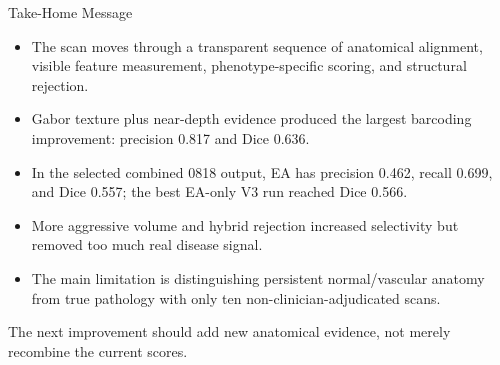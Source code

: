 \documentclass[aspectratio=169]{beamer}
\begin{document}
\begin{frame}{Take-Home Message}

\begin{itemize}
    \item The scan moves through a transparent sequence of anatomical
    alignment, visible feature measurement, phenotype-specific scoring, and
    structural rejection.
    \item Gabor texture plus near-depth evidence produced the largest barcoding
    improvement: precision 0.817 and Dice 0.636.
    \item In the selected combined 0818 output, EA has precision 0.462, recall
    0.699, and Dice 0.557; the best EA-only V3 run reached Dice 0.566.
    \item More aggressive volume and hybrid rejection increased selectivity
    but removed too much real disease signal.
    \item The main limitation is distinguishing persistent normal/vascular
    anatomy from true pathology with only ten non-clinician-adjudicated scans.
\end{itemize}

\vspace{0.3cm}
\centering
\large The next improvement should add new anatomical evidence, not merely
recombine the current scores.

\end{frame}
\end{document}
